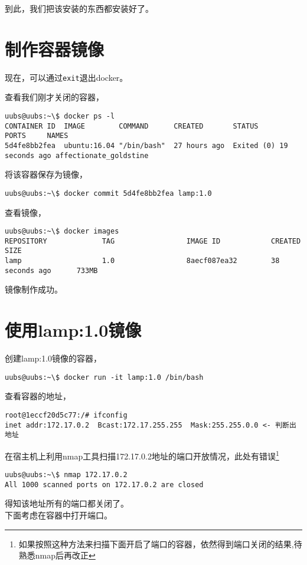 \documentclass[a4]{article}
\begin{document}
到此，我们把该安装的东西都安装好了。

\section{制作容器镜像}

现在，可以通过\lstinline{exit}退出docker。

查看我们刚才关闭的容器，
\begin{lstlisting}
uubs@uubs:~\$ docker ps -l
CONTAINER ID  IMAGE        COMMAND      CREATED       STATUS      PORTS     NAMES
5d4fe8bb2fea  ubuntu:16.04 "/bin/bash"  27 hours ago  Exited (0) 19 seconds ago affectionate_goldstine
\end{lstlisting}

将该容器保存为镜像，
\begin{lstlisting}
uubs@uubs:~\$ docker commit 5d4fe8bb2fea lamp:1.0
\end{lstlisting}

查看镜像，
\begin{lstlisting}
uubs@uubs:~\$ docker images
REPOSITORY             TAG                 IMAGE ID            CREATED             SIZE
lamp                   1.0                 8aecf087ea32        38 seconds ago      733MB
\end{lstlisting}

镜像制作成功。

\section{使用lamp:1.0镜像}

创建lamp:1.0镜像的容器，
\begin{lstlisting}
uubs@uubs:~\$ docker run -it lamp:1.0 /bin/bash
\end{lstlisting}

查看容器的地址，
\begin{lstlisting}
root@1eccf20d5c77:/# ifconfig
inet addr:172.17.0.2  Bcast:172.17.255.255  Mask:255.255.0.0 <- 判断出地址
\end{lstlisting}

在宿主机上利用nmap工具扫描172.17.0.2地址的端口开放情况，此处有错误\footnote{如果按照这种方法来扫描下面开启了端口的容器，依然得到端口关闭的结果,待熟悉nmap后再改正}
\begin{lstlisting}
uubs@uubs:~\$ nmap 172.17.0.2
All 1000 scanned ports on 172.17.0.2 are closed
\end{lstlisting}

得知该地址所有的端口都关闭了。\\
下面考虑在容器中打开端口。
\end{document}
